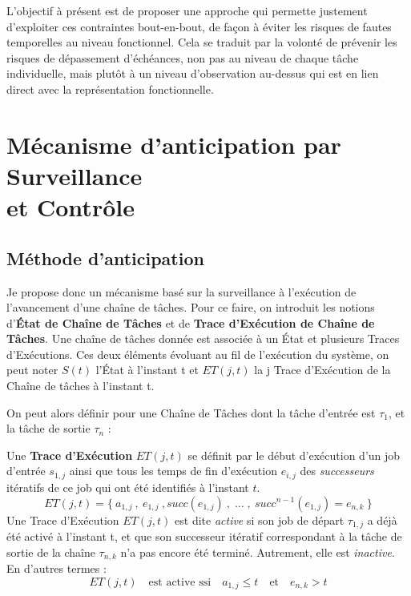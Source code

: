 \documentclass[french, a4paper, 11pt, twoside, pdftex]{StyleThese}
\begin{document}
	\smallbreak 
	
	L'objectif à présent est de proposer une approche qui permette justement d'exploiter ces contraintes bout-en-bout, de façon à éviter les risques de fautes temporelles au niveau fonctionnel. Cela se traduit par la volonté de prévenir les risques de dépassement d'échéances, non pas au niveau de chaque tâche individuelle, mais plutôt à un niveau d'observation au-dessus qui est en lien direct avec la représentation fonctionnelle.
	
    
\section[Mécanisme d'anticipation]{Mécanisme d'anticipation par Surveillance \\ et Contrôle}
    \subsection{Méthode d'anticipation}
    
    Je propose donc un mécanisme basé sur la surveillance à l'exécution de l'avancement d'une chaîne de tâches. 
    Pour ce faire, on introduit les notions d'\textbf{État de Chaîne de Tâches} et de \textbf{Trace d'Exécution de Chaîne de Tâches}. Une chaîne de tâches donnée est associée à un État et plusieurs Traces d'Exécutions. Ces deux éléments évoluant au fil de l'exécution du système, on peut noter $S(t)$ l'État à l'instant t et $ET(j,t)$ la j Trace d'Exécution de la Chaîne de tâches à l'instant t.
    
    On peut alors définir pour une Chaîne de Tâches dont la tâche d'entrée est $\tau_{1}$, et la tâche de sortie $\tau_{n}$ : 
    \begin{definition} \label{def:TraceExecutionChaine}
    	Une \textbf{Trace d'Exécution} $ET(j,t)$ se définit par le début d'exécution d'un job d'entrée $s_{1,j}$ ainsi que tous les temps de fin d'exécution $e_{i,j}$ des \textit{successeurs} itératifs de ce job qui ont été identifiés à l'instant $t$.
    	\begin{equation*}
    		ET(j,t) = \{\: a_{1,j} \:,\: e_{1,j} \:, succ(e_{1,j})\:, \;\dots\; ,\: succ^{n-1}(e_{1,j}) = e_{n,k} \:\}
    	\end{equation*}    	
    	Une Trace d'Exécution $ET(j,t)$ est dite \emph{active} si son job de départ $\tau_{1,j}$ a déjà été activé à l'instant t, et que son successeur itératif correspondant à la tâche de sortie de la chaîne $\tau_{n,k}$ n'a pas encore été terminé. Autrement, elle est \textit{inactive}. En d'autres termes :
    	\begin{equation*}
    		ET(j,t)  \quad \textrm{est active ssi}\quad  a_{1,j} \leq t \quad \textrm{et} \quad e_{n,k} > t
    	\end{equation*}
    \end{definition}
    
\end{document}

